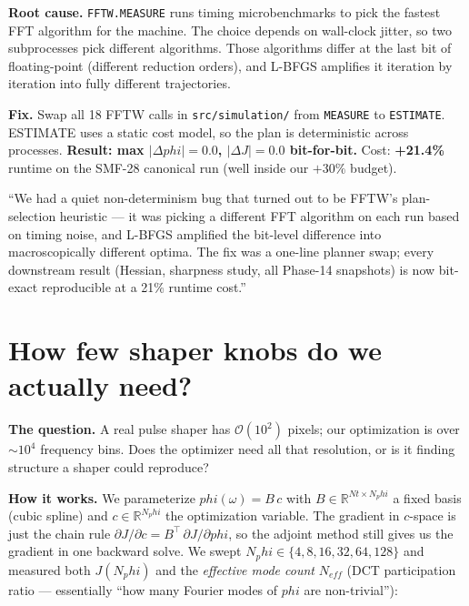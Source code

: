 \documentclass[11pt,letterpaper]{article}
\def\varphi{phi}\def\lambda{lambda}\def\mathrm#1{#1}%
\begin{document}
\textbf{Root cause.} \texttt{FFTW.MEASURE} runs timing microbenchmarks to pick the fastest FFT algorithm for the machine. The choice depends on wall-clock jitter, so two subprocesses pick different algorithms. Those algorithms differ at the last bit of floating-point (different reduction orders), and L-BFGS amplifies it iteration by iteration into fully different trajectories.

\textbf{Fix.} Swap all 18 FFTW calls in \texttt{src/simulation/} from \texttt{MEASURE} to \texttt{ESTIMATE}. ESTIMATE uses a static cost model, so the plan is deterministic across processes. \textbf{Result: max $|\Delta\varphi| = 0.0$, $|\Delta J| = 0.0$ bit-for-bit.} Cost: \textbf{+21.4\%} runtime on the SMF-28 canonical run (well inside our $+30\%$ budget).

\begin{say}
``We had a quiet non-determinism bug that turned out to be FFTW's plan-selection heuristic --- it was picking a different FFT algorithm on each run based on timing noise, and L-BFGS amplified the bit-level difference into macroscopically different optima. The fix was a one-line planner swap; every downstream result (Hessian, sharpness study, all Phase-14 snapshots) is now bit-exact reproducible at a 21\% runtime cost.''
\end{say}

\section{How few shaper knobs do we actually need?}

\textbf{The question.} A real pulse shaper has $\mathcal{O}(10^2)$ pixels; our optimization is over $\sim 10^4$ frequency bins. Does the optimizer need all that resolution, or is it finding structure a shaper could reproduce?

\textbf{How it works.} We parameterize $\varphi(\omega) = B \, c$ with $B \in \mathbb{R}^{\mathrm{Nt} \times \mathrm{N}_\varphi}$ a fixed basis (cubic spline) and $c \in \mathbb{R}^{\mathrm{N}_\varphi}$ the optimization variable. The gradient in $c$-space is just the chain rule $\partial J / \partial c = B^\top \, \partial J / \partial \varphi$, so the adjoint method still gives us the gradient in one backward solve. We swept $\mathrm{N}_\varphi \in \{4, 8, 16, 32, 64, 128\}$ and measured both $J(\mathrm{N}_\varphi)$ and the \emph{effective mode count} $\mathrm{N}_{\mathrm{eff}}$ (DCT participation ratio --- essentially ``how many Fourier modes of $\varphi$ are non-trivial''):
\end{document}
